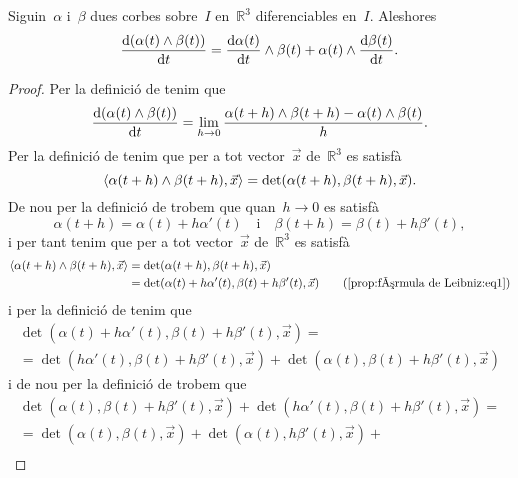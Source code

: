 \documentclass[../../Main.tex]{subfiles}
\begin{document}
	\begin{proposition}
		\label{prop:fórmula de Leibniz}
		\label{prop:fórmula per la derivada del producte vectorial de dues corbes}
		Siguin~\(\alpha\) i~\(\beta\) dues corbes sobre~\(I\) en~\(\mathbb{R}^{3}\) diferenciables en~\(I\).
		Aleshores
		\[
		    \frac{\mathop{}\!\mathrm{d}(\alpha(t)\mathbin{\wedge}\beta(t))}{\mathop{}\!\mathrm{d} t}=\frac{\mathop{}\!\mathrm{d}\alpha(t)}{\mathop{}\!\mathrm{d} t}\mathbin{\wedge}\beta(t)+\alpha(t)\mathbin{\wedge}\frac{\mathop{}\!\mathrm{d}\beta(t)}{\mathop{}\!\mathrm{d} t}.
		\]
		\begin{proof}
			Per la definició de  tenim que
			\begin{equation}
				\label{prop:fórmula de Leibniz:eq2}
				\frac{\mathop{}\!\mathrm{d}(\alpha(t)\mathbin{\wedge}\beta(t))}{\mathop{}\!\mathrm{d} t}=\lim_{h\to0}\frac{\alpha(t+h)\mathbin{\wedge}\beta(t+h)-\alpha(t)\mathbin{\wedge}\beta(t)}{h}.
			\end{equation}
			Per la definició de  tenim que per a tot vector~\(\vec{x}\) de~\(\mathbb{R}^{3}\) es satisfà
			\[
			    \prodesc{\alpha(t+h)\prodvec\beta(t+h)}{\vec{x}}=\det(\alpha(t+h),\beta(t+h),\vec{x}).
			\]
			De nou per la definició de  trobem que quan~\(h\to0\) es satisfà
			\begin{equation}
				\label{prop:fórmula de Leibniz:eq1}
				\alpha(t+h)=\alpha(t)+h\alpha'(t)\quad\text{i}\quad\beta(t+h)=\beta(t)+h\beta'(t),
			\end{equation}
			i per tant tenim que per a tot vector~\(\vec{x}\) de~\(\mathbb{R}^{3}\) es satisfà
			\begin{align*}
				\prodesc{\alpha(t+h)\prodvec\beta(t+h)}{\vec{x}}&=\det(\alpha(t+h),\beta(t+h),\vec{x}) \\
				&=\det(\alpha(t)+h\alpha'(t),\beta(t)+h\beta'(t),\vec{x}) \tag{\ref{prop:fórmula de Leibniz:eq1}}
			\end{align*}
			i per la definició de  tenim que
			\begin{multline*}
				\det(\alpha(t)+h\alpha'(t),\beta(t)+h\beta'(t),\vec{x})=\\
				=\det(h\alpha'(t),\beta(t)+h\beta'(t),\vec{x})+\det(\alpha(t),\beta(t)+h\beta'(t),\vec{x})
			\end{multline*}
			i de nou per la definició de  trobem que
			\begin{multline*}
				\det(\alpha(t),\beta(t)+h\beta'(t),\vec{x})+\det(h\alpha'(t),\beta(t)+h\beta'(t),\vec{x})=\\
				=\det(\alpha(t),\beta(t),\vec{x})+\det(\alpha(t),h\beta'(t),\vec{x})+\\

\end{multline*}
\end{proof}
\end{proposition}
\end{document}
